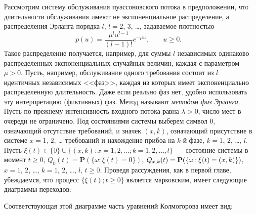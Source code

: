 \documentclass[10pt,oneside,final]{book}
\renewcommand{\Pr}{{\mathbf P}}
\newcommand*{\hm}[1]{#1\nobreak\discretionary{}%
  {\hbox{$\mathsurround=0pt #1$}}{}}
\begin{document}
Рассмотрим систему обслуживания пуассоновского потока в предположении, что
длительности обслуживания имеют не экспоненциальное распределение, а
распределения Эрланга порядка $l$, $l=2$, $3$, \ldots{}, задаваемое плотностью
\[
p(u)=\dfrac{\mu^l u^{l-1}}{(l-1)!}e^{-\mu u},\qquad u\geqslant0.
\]
Такое распределение получается, например, для суммы $l$ независимых одинаково
распределенных экспоненциальных случайных величин, каждая с параметром
$\mu>0$. Пусть, например, обслуживание одного требования состоит из $l$
идентичных независимых <<фаз>>, каждая из которых имеет экспоненциально
распределенную длительность. Даже если реально фаз нет, удобно использовать эту
интерпретацию (фиктивных) фаз. Метод называют \emph{методом фаз Эрланга}. Пусть
по-прежнему интенсивность входного потока равна $\lambda>0$, число мест в
очереди не ограничено. Под состояниями системы выберем символ $0$, означающий
отсутствие требований, и значек $(x,k)$, означающий присутствие в системе $x=1$,
$2$, \ldots{} требований и нахождение прибоа на $k$-й фазе, $k=1$, $2$, \ldots,
$l$. Пусть $\xi(t)\in\{0\}\cup\{ (x,k)\colon x=1,2, \ldots; k=1, 2, \ldots,
l\}$~--- состояние системы в момент $t\geqslant0$, $Q_0(t)=\Pr(\{\omega\colon
\xi(t)=0\})$, $Q_{x,k}(t)\hm=\Pr(\{\omega\colon \xi(t)=(x,k)\})$, $x=1$, $2$, \ldots,
$k=1$, $2$, \ldots, $l$, $t\geqslant0$. Проведя рассуждения, как в
первой главе, убеждаемся, что процесс $\{\xi(t);
t\geqslant0\}$ является марковским, имеет следующие диаграммы переходов:
\begin{figure}[htb]
  \centering
\end{figure}
Соответствующая этой диаграмме часть уравнений Колмогорова имеет вид:
\end{document}
